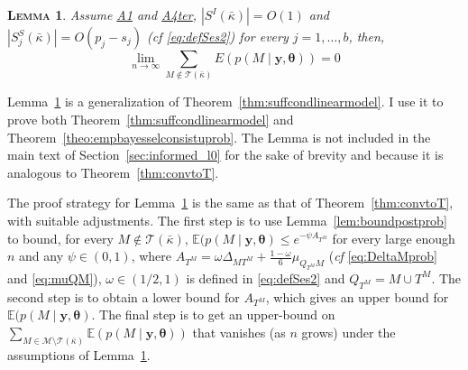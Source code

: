 \documentclass[
  12pt]{article}
\newcommand{\E}{\mathbb{E}}
\newcommand{\M}{\mathcal{M}}
\newcommand{\T}{\mathcal{T}}
\newcommand{\by}{\mathbf{y}}
\newcommand{\btheta}{\boldsymbol{\theta}}
\newtheorem{lem}[thm]{\textsc{Lemma}}
\begin{document}
\begin{lem}\label{thm:convtoTprob}
    Assume \hyperlink{lab:A1}{A1} and \hyperlink{lab:A4ter}{A4ter}, $|S^{I}(\bar{\kappa})|=O(1)$ and $|S^{S}_j(\bar{\kappa})|=O(p_j-s_j)$ (\emph{cf} \eqref{eq:defSes2}) for every $j=1,\ldots,b$, then,
    $$\lim_{n \to \infty} \sum_{M \not\in \T(\bar{\kappa})} E\left(p(M\mid \by, \btheta)\right)= 0$$
\end{lem}

Lemma~\ref{thm:convtoTprob} is a generalization of Theorem~\ref{thm:suffcondlinearmodel}. I use it to prove both Theorem~\ref{thm:suffcondlinearmodel} and Theorem~\ref{theo:empbayesselconsistuprob}. The Lemma is not included in the main text of Section~\ref{sec:informed_l0} for the sake of brevity and because it is analogous to Theorem~\ref{thm:convtoT}.

The proof strategy for Lemma~\ref{thm:convtoTprob} is the same as that of Theorem~\ref{thm:convtoT}, with suitable adjustments. 
The first step is to use Lemma~\ref{lem:boundpostprob} to bound, for every $M\not\in \T(\bar{\kappa})$, $\E(p(M\mid \by, \btheta) \leq e^{-\psi A_{T^M}}$ for every large enough $n$ and any $\psi \in (0,1)$, where $A_{T^M}=\omega\Delta_{MT^M}+\tfrac{1-\omega}{6}\mu_{Q_{T^M}M}$ (\emph{cf} \eqref{eq:DeltaMprob} and \eqref{eq:muQM}), $\omega\in(1/2,1)$ is defined in \eqref{eq:defSes2} and $Q_{T^M}= M\cup T^M$. The second step is to obtain a lower bound for $A_{T^M}$, which gives an upper bound for $\E(p(M\mid \by, \btheta)$.
The final step is to %
get an upper-bound on $\sum_{M \in \M\setminus \T(\bar{\kappa})} \E\left(p(M\mid \by, \btheta)\right)$ that vanishes (as $n$ grows) under the assumptions of Lemma~\ref{thm:convtoTprob}.
\end{document}
